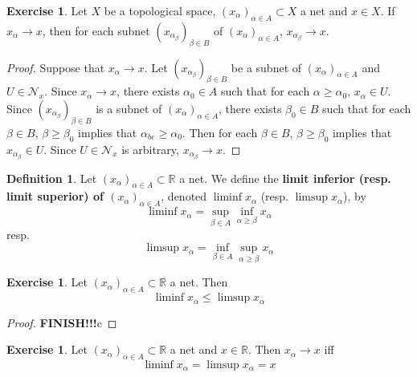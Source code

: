 \documentclass[12pt]{amsart}
\theoremstyle{definition}
\newtheorem{defn}[definition]{Definition}
\newtheorem{ex}[definition]{Exercise}
\newcommand{\al}{\alpha}
\newcommand{\be}{\beta}
\newcommand{\R}{\mathbb{R}}
\newcommand{\MN}{\mathcal{N}}
\newcommand{\tbf}[1]{\textbf{#1}}
\DeclareMathOperator*{\0}{\mbf{0}}
\DeclareMathOperator*{\1}{\mbf{1}}
\begin{document}
	\begin{ex}
		Let $X$ be a topological space, $(x_{\al})_{\al \in A} \subset X$ a net and $x \in X$. If $x_{\al} \rightarrow x$, then for each subnet $(x_{\al_{\be}})_{\be \in B}$ of $(x_{\al})_{\al \in A}$, $x_{\al_{\be}} \rightarrow x$.
	\end{ex}

	\begin{proof}
		Suppose that $x_{\al} \rightarrow x$. Let $(x_{\al_{\be}})_{\be \in B}$ be a subnet of $(x_{\al})_{\al \in A}$ and $U \in \MN_x$. Since $x_{\al} \rightarrow x$, there exists $\al_0 \in A$ such that for each $\al \geq \al_0$, $x_{\al} \in U$. Since $(x_{\al_{\be}})_{\be \in B}$ is a subnet of $(x_{\al})_{\al \in A}$, there exists $\be_0 \in B$ such that for each $\be \in B$, $\be \geq \be_0$ implies that $\al_{be} \geq \al_0$. Then for each $\be \in B$, $\be \geq \be_0$ implies that $x_{\al_{\be}} \in U$. Since $U \in \MN_x$ is arbitrary, $x_{\al_{\be}} \rightarrow x$.
	\end{proof}
	
	
	
	
	
	\begin{defn}
		Let $(x_{\al})_{\al \in A} \subset \R$ a net. We define the \tbf{limit inferior (resp. limit superior) of $(x_{\al})_{\al \in A}$}, denoted $\liminf x_{\al}$ (resp. $\limsup x_{\al}$), by 
		$$\liminf x_{\al} = \sup_{\beta \in A } \inf_{\al \geq \beta} x_{\al}$$ 
		resp. 
		$$\limsup x_{\al} = \inf_{\beta \in A } \sup_{\al \geq \beta} x_{\al}$$  
	\end{defn}

	\begin{ex}
		Let $(x_{\al})_{\al \in A} \subset \R$ a net. Then $$\liminf x_{\al} \leq \limsup x_{\al}$$
	\end{ex}

	\begin{proof}
		\tbf{FINISH!!!}c
	\end{proof}

	\begin{ex}
		Let $(x_{\al})_{\al \in A} \subset \R$ a net and $x \in \R$. Then $x_{\al} \rightarrow x$ iff $$\liminf x_{\al} = \limsup x_{\al} = x$$
	\end{ex}
\end{document}
